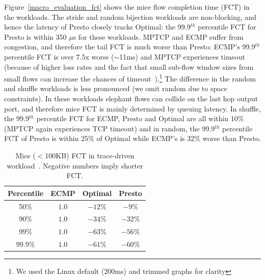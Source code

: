 Figure~\ref{macro_evaluation_fct} shows the mice flow completion time (FCT) in
the workloads. 
The stride and random bijection workloads are non-blocking, and hence the latency of Presto
closely tracks Optimal: the 99.9$^{th}$ percentile FCT for Presto is within 350 $\mu$s for these workloads.
MPTCP and ECMP suffer from congestion, and therefore the tail FCT is much worse than Presto: ECMP's 99.9$^{th}$ percentile
FCT is over 7.5x worse ($\sim$11ms) and MPTCP experiences timeout (because of higher loss
rates and the fact that small sub-flow window sizes from small flows can increase the chances of timeout~\cite{dc-mptcp}).\footnote{We used the Linux default (200ms) and trimmed graphs for clarity}
The difference in the random and shuffle workloads is less pronounced (we omit random due to space constraints).
In these workloads elephant flows can collide on the last hop output port,
and therefore mice FCT is mainly determined by queuing latency. In shuffle, the 99.9$^{th}$ percentile FCT for ECMP, Presto and Optimal
are all within 10\% (MPTCP again experiences TCP timeout) and in random, the 99.9$^{th}$ percentile FCT of Presto is within 25\% of Optimal while ECMP's 
is 32\% worse than Presto.

\begin{table}[!tb]
\begin{center}
\begin{tabular}{ |c|c|c|c| }
 \hline
 Percentile & ECMP & Optimal &Presto \\
 \hline
 50\%   & $1.0$ & $-12\%$ & $-9\%$   \\
 90\%   & $1.0$ & $-34\%$ & $-32\%$  \\
 99\%   & $1.0$ & $-63\%$  & $-56\%$ \\
 99.9\% & $1.0$ & $-61\%$ & $-60\%$  \\
 \hline

\end{tabular}
\caption{Mice ($<$100KB) FCT in trace-driven workload~\cite{kandula2009nature}. Negative numbers imply shorter FCT.}
        \label{macro_evaluation_MSR_trace_driven}
\end{center}
\end{table}

